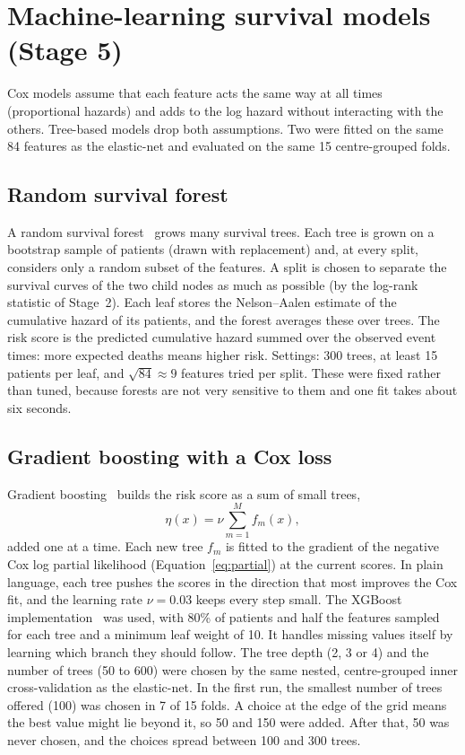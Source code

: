 \documentclass[11pt,a4paper]{article}
\begin{document}
\section{Machine-learning survival models (Stage 5)}
\label{sec:trees}
Cox models assume that each feature acts the same way at all times (proportional hazards)
and adds to the log hazard without interacting with the others. Tree-based models drop
both assumptions. Two were fitted on the same 84 features as the elastic-net and
evaluated on the same 15 centre-grouped folds.

\subsection{Random survival forest}
A random survival forest~\cite{ishwaran2008} grows many survival trees. Each tree is grown
on a bootstrap sample of patients (drawn with replacement) and, at every split, considers
only a random subset of the features. A split is chosen to separate the survival curves
of the two child nodes as much as possible (by the log-rank statistic of Stage~2). Each
leaf stores the Nelson--Aalen estimate of the cumulative hazard of its patients, and the
forest averages these over trees. The risk score is the predicted cumulative hazard summed
over the observed event times: more expected deaths means higher risk. Settings: 300
trees, at least 15 patients per leaf, and $\sqrt{84} \approx 9$ features tried per split.
These were fixed rather than tuned, because forests are not very sensitive to them and one
fit takes about six seconds.

\subsection{Gradient boosting with a Cox loss}
Gradient boosting~\cite{friedman2001} builds the risk score as a sum of small trees,
\[
\eta(x) = \nu \sum_{m=1}^{M} f_m(x),
\]
added one at a time. Each new tree $f_m$ is fitted to the gradient of the negative Cox
log partial likelihood (Equation~\eqref{eq:partial}) at the current scores. In plain
language, each tree pushes the scores in the direction that most improves the Cox fit,
and the learning rate $\nu = 0.03$ keeps every step small. The XGBoost
implementation~\cite{chen2016} was used, with 80\% of patients and half the features
sampled for each tree and a minimum leaf weight of 10. It handles missing values itself
by learning which branch they should follow. The tree depth (2, 3 or 4) and the number of
trees (50 to 600) were chosen by the same nested, centre-grouped inner cross-validation
as the elastic-net. In the first run, the smallest number of trees offered (100) was chosen
in 7 of 15 folds. A choice at the edge of the grid means the best value might lie beyond
it, so 50 and 150 were added. After that, 50 was never chosen, and the choices spread
between 100 and 300 trees.
\end{document}
